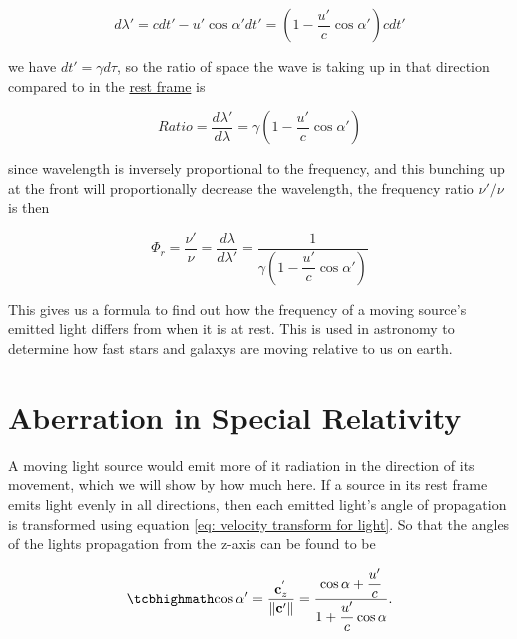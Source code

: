 \begin{equation}
	{d\lambda{'}} = {c}{dt{'}}-{u}{'} \cos\alpha{'} {dt{'}} = (1-\frac{u{'}}{c}\cos\alpha{'})cdt{'}
\end{equation}

we have ${dt{'}} = {\gamma} {d\tau}$, so the ratio of space the wave is taking up in that direction compared to in the \hyperlink{def-proper-frame}{rest frame} is

\begin{equation}
	Ratio = \frac{d\lambda{'}}{d\lambda} = {\gamma} \left(1-\dfrac{u{'}}{c} \cos\alpha{'} \right)
\end{equation}

since wavelength is inversely proportional to the frequency, and this bunching up at the front will proportionally decrease the wavelength, the frequency ratio $\nu{'}/\nu$ is then

\begin{equation}
	\Phi_{r} = \frac{\nu{'}}{\nu} = \frac{d\lambda}{d\lambda{'}} = \frac{1}{ {\gamma} \left(1-\dfrac{u{'}}{c} \cos\alpha{'} \right)}
\end{equation}

This gives us a formula to find out how the frequency of a moving source's emitted light differs from when it is at rest.
This is used in astronomy to determine how fast stars and galaxys are moving relative to us on earth.


\section{Aberration in Special Relativity} \label{sect: Aberration in Special Relativity}

A moving light source would emit more of it radiation in the direction of its movement, which we will show by how much here.
If a source in its rest frame emits light evenly in all directions, then each emitted light's angle of propagation is transformed using equation \eqref{eq: velocity transform for light}.
So that the angles of the lights propagation from the z-axis can be found to be

\begin{equation}
	\label{eq: Cosine transform}
	\mhl{
		\cos\alpha{'} = \frac{\mathbf{c}_{z}^{'}}{\|\mathbf{c}{'}\|} = \dfrac{\cos\alpha + \dfrac{u{'}}{c}}{1 + \dfrac{u{'}}{c}\cos\alpha}.
	}
\end{equation}

